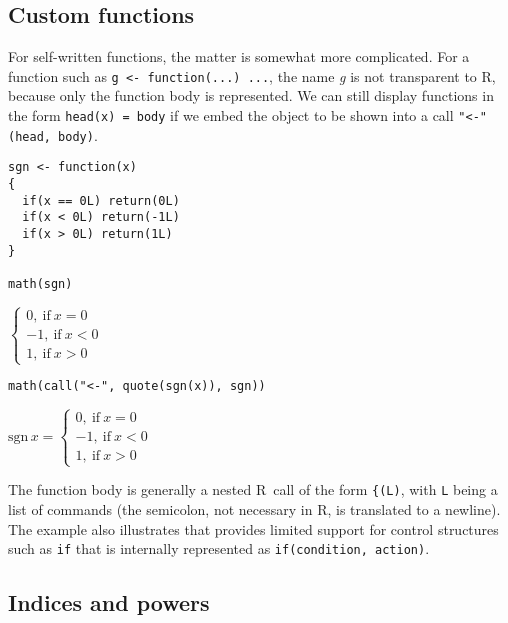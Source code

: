 \hypertarget{custom-functions}{%
\subsection{Custom functions}\label{custom-functions}}

For self-written functions, the matter is somewhat more complicated. For a function
such as \texttt{g\ \textless{}-\ function(...)\ ...}, the name \emph{g} is not transparent to R, because
only the function body is represented. We can still display functions in the
form \texttt{head(x)\ =\ body} if we embed the object to be shown into a
call \texttt{"\textless{}-"(head,\ body)}.

\begin{verbatim}
sgn <- function(x)
{
  if(x == 0L) return(0L)
  if(x < 0L) return(-1L)
  if(x > 0L) return(1L)
}

math(sgn)
\end{verbatim}

\(\left\{\begin{array}{l}{{0},\ \mathrm{if}\ {{x}{=}{0}}}\\ {{{-}{1}},\ \mathrm{if}\ {{x}{<}{0}}}\\ {{1},\ \mathrm{if}\ {{x}{>}{0}}}\end{array}\right.\)

\begin{verbatim}
math(call("<-", quote(sgn(x)), sgn))
\end{verbatim}

\({\mathrm{sgn}\,{x}}{=}{\left\{\begin{array}{l}{{0},\ \mathrm{if}\ {{x}{=}{0}}}\\ {{{-}{1}},\ \mathrm{if}\ {{x}{<}{0}}}\\ {{1},\ \mathrm{if}\ {{x}{>}{0}}}\end{array}\right.}\)

The function body is generally a nested R~call of the form \texttt{\textquotesingle{}\{\textquotesingle{}(L)}, with \texttt{L}
being a list of commands (the semicolon, not necessary in R, is translated to a
newline). The example also illustrates that  provides limited
support for control structures such as \texttt{if} that is internally represented
as \texttt{if(condition,\ action)}.

\hypertarget{indices-and-powers}{%
\subsection{Indices and powers}\label{indices-and-powers}}

